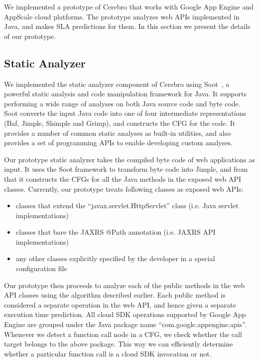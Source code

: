 We implemented a prototype of Cerebro that works with Google App Engine and AppScale cloud platforms.
The prototype analyzes web APIs implemented in Java, and makes SLA predictions for them.  In this
section we present the details of our prototype.

\subsection{Static Analyzer}
We implemented the static analyzer component of Cerebro using Soot~\cite{Vallee-Rai:2010:SJB:1925805.1925818}, a powerful
static analysis and code manipulation framework for Java. It supports performing a wide range of analyses on both Java source
code and byte code. Soot converts the input Java code into one of four intermediate representations (Baf, Jimple,
 Shimple and Grimp), and constructs the CFG for the code. It provides a number of common static
 analyses as built-in utilities, and also provides a set of programming APIs to enable developing custom
 analyses.
 
Our prototype static analyzer takes the compiled byte code of web applications as input. It uses the
Soot framework to transform byte code into Jimple, and from that it constructs the CFGs for 
all the Java methods in the exposed web API classes. Currently, our
prototype treats following classes as exposed web APIs:

\begin{itemize}
\item classes that extend the ``javax.servlet.HttpServlet'' class (i.e. Java servlet implementations)
\item classes that bare the JAXRS @Path annotation (i.e. JAXRS API implementations)
\item any other classes explicitly specified by the developer in a special configuration file
\end{itemize}
 
Our prototype then proceeds to analyze each of the public methods in the web API classes
using the algorithm described earlier. Each public method is considered a separate operation
in the web API, and hence given a separate execution time prediction.
All cloud SDK operations supported by Google App Engine
are grouped under the Java package name ``com.google.appengine.apis''. Whenever we detect
a function call node in a CFG, we check whether the call target belongs to the above package.
This way we can efficiently determine whether a particular function call is a cloud SDK invocation or
not.

